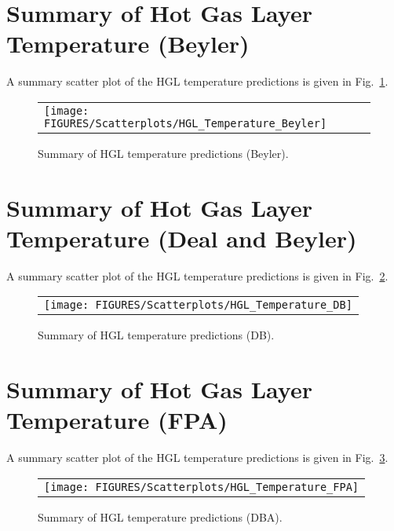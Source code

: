 \section{Summary of Hot Gas Layer Temperature (Beyler)}

A summary scatter plot of the HGL temperature predictions is given in Fig.~\ref{hgl_temperature_beyler_summary}. 

\begin{figure}[p]
\begin{center}
\begin{tabular}{l}
\texttt{[image: FIGURES/Scatterplots/HGL\_Temperature\_Beyler]}
\end{tabular}
\end{center}
\caption[Summary of HGL temperature predictions (Beyler).]
{Summary of HGL temperature predictions (Beyler).}
\label{hgl_temperature_beyler_summary}
\end{figure}

\section{Summary of Hot Gas Layer Temperature (Deal and Beyler)}

A summary scatter plot of the HGL temperature predictions is given in Fig.~\ref{hgl_temperature_DB_summary}. 

\begin{figure}[p]
\begin{center}
\begin{tabular}{l}
\texttt{[image: FIGURES/Scatterplots/HGL\_Temperature\_DB]}
\end{tabular}
\end{center}
\caption[Summary of HGL temperature predictions (DB).]
{Summary of HGL temperature predictions (DB).}
\label{hgl_temperature_DB_summary}
\end{figure}

\section{Summary of Hot Gas Layer Temperature (FPA)}

A summary scatter plot of the HGL temperature predictions is given in Fig.~\ref{hgl_temperature_FPA_summary}. 

\begin{figure}[p]
\begin{center}
\begin{tabular}{l}
\texttt{[image: FIGURES/Scatterplots/HGL\_Temperature\_FPA]}
\end{tabular}
\end{center}
\caption[Summary of HGL temperature predictions (DBA).]
{Summary of HGL temperature predictions (DBA).}
\label{hgl_temperature_FPA_summary}
\end{figure}

